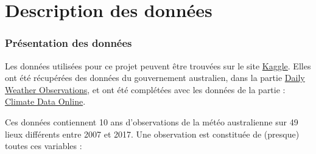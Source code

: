 \documentclass{article}
\begin{document}
\part{Description des données}

\section{Présentation des données}

Les données utilisées pour ce projet peuvent être trouvées sur le site \href{https://www.kaggle.com/jsphyg/weather-dataset-rattle-package}{Kaggle}. Elles ont été récupérées des données du gouvernement australien, dans la partie \href{http://www.bom.gov.au/climate/dwo}{Daily Weather Observations}, et ont été complétées avec les données de la partie :  \href{http://www.bom.gov.au/climate/data}{Climate Data Online}.

Ces données contiennent 10 ans d'observations de la météo australienne sur 49 lieux différents entre 2007 et 2017. Une observation est constituée de (presque) toutes ces variables : 
\end{document}

